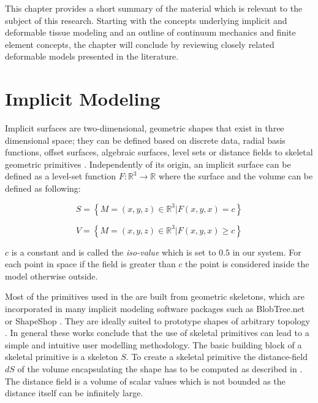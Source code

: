 \label{chapter:background}

\newlength{\savedunitlength}
\setlength{\unitlength}{2em}
This chapter provides a short summary of the material which is relevant to the subject of this research. Starting with the concepts underlying 
implicit and deformable tissue modeling and an outline of continuum mechanics and finite element concepts, the chapter will conclude by reviewing closely related 
deformable models presented in the literature. 

\section{Implicit Modeling}
\label{sec:implicitmodelingintro}
Implicit surfaces are two-dimensional, geometric shapes that exist in three dimensional space; they can be defined based on discrete data, 
radial basis functions, offset surfaces, algebraic surfaces, level sets or distance fields to skeletal geometric primitives \cite{Bloomenthal1997}.
Independently of its origin, an implicit surface can be defined as a level-set function $F:\mathbb{R}^3 \rightarrow \mathbb{R}$ where the surface 
and the volume can be defined as following:

\begin{equation}
S = \left\{M = (x,y,z) \in \mathbb{R}^3 | F(x,y,x) = c\right\}
\end{equation}

\begin{equation}
V = \left\{M = (x,y,z) \in \mathbb{R}^3 | F(x,y,x) \geq c\right\}
\end{equation}

$c$ is a constant and is called the \textit{iso-value} which is set to $0.5$ in our system. For each point in space if the field is greater than
$c$ the point is considered inside the model otherwise outside. 

Most of the primitives used in the \blob are built from geometric skeletons, which are incorporated in many implicit modeling software packages 
such as BlobTree.net \cite{de2008blobtree} or ShapeShop \cite{Schmidt2006}. They are ideally suited to prototype shapes of arbitrary topology 
\cite{Bloomenthal1997}. In general these works conclude that the use of skeletal primitives can lead to a simple and intuitive user modelling 
methodology. The basic building block of a skeletal primitive is a skeleton $S$. To create a skeletal primitive the distance-field $dS$ of the 
volume encapsulating the shape has to be computed as described in \cite{Barbier2004}. The distance field is a volume of scalar values which is 
not bounded as the distance itself can be infinitely large.

